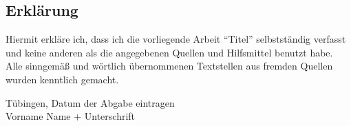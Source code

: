
\thispagestyle{empty}
\subsection*{Erklärung}
{\RaggedRight
Hiermit erkläre ich, dass ich die vorliegende Arbeit 
\enquote{Titel}
selbstständig verfasst und keine anderen als die angegebenen Quellen und Hilfsmittel benutzt habe.
Alle sinngemäß und wörtlich übernommenen Textstellen aus fremden Quellen wurden kenntlich gemacht.}
\vspace{5em}

Tübingen, Datum der Abgabe eintragen		\\[2em]
Vorname Name + Unterschrift


\cleardoubleoddpage

